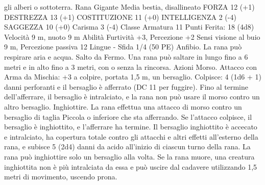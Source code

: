 \begin{multicols}{2}
gli alberi o sottoterra.
Rana Gigante
Media bestia, disallineato
FORZA 12 (+1)
DESTREZZA 13 (+1)
COSTITUZIONE 11 (+0)
INTELLIGENZA 2 (-4)
SAGGEZZA 10 (+0)
Carisma 3 (-4)
Classe Armatura 11
\hspace*{0pt}\hfill{Punti Ferita}: 18 (4d8)
Velocità 9 m, nuoto 9 m
Abilità Furtività +3, Percezione +2
Sensi visione al buio 9 m, Percezione passiva 12
Lingue -
Sfida 1/4 (50 PE)
Anfibio. La rana può respirare aria e acqua.
Salto da Fermo. Una rana può saltare in lungo fino a 6 metri e in
alto fino a 3 metri, con o senza la rincorsa.
Azioni
Morso. Attacco con Arma da Mischia: +3 a colpire, portata 1,5
m, un bersaglio.
Colpisce: 4 (1d6 + 1) danni perforanti e il bersaglio è afferrato
(DC 11 per fuggire). Fino al termine dell’afferrare, il bersaglio è
intralciato, e la rana non può usare il morso contro un altro
bersaglio.
Inghiottire. La rana effettua una attacco di morso contro un
bersaglio di taglia Piccola o inferiore che sta afferrando. Se
l’attacco colpisce, il bersaglio è inghiottito, e l’afferrare ha
termine. Il bersaglio inghiottito è accecato e intralciato, ha
copertura totale contro gli attacchi e altri effetti all’esterno della
rana, e subisce 5 (2d4) danni da acido all’inizio di ciascun turno
della rana. La rana può inghiottire solo un bersaglio alla volta.
Se la rana muore, una creatura inghiottita non è più intralciata da
essa e può uscire dal cadavere utilizzando 1,5 metri di
movimento, uscendo prona.
 

\end{multicols}
